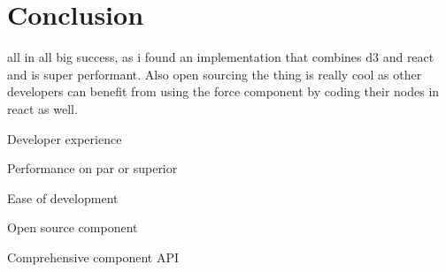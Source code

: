 \chapter{Conclusion}
\label{cha:conclusion}

all in all big success, as i found an implementation that combines d3 and react and is super performant. Also open sourcing the thing is really cool as other developers can benefit from using the force component by coding their nodes in react as well.

Developer experience

Performance on par or superior

Ease of development

Open source component

Comprehensive component API

